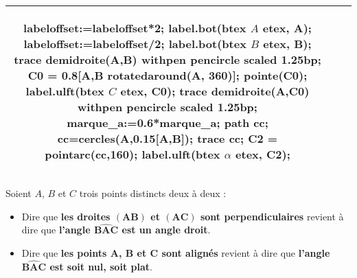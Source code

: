 \begin{changemargin}{0mm}{-20mm}
\begin{definition}[Classement des angles selon leur mesure $\alpha=\widehat{BAC}$]
\begin{center}
{\begin{tabular}{|*3{c|}}
\begin{Geometrie}[CoinBG={(-u,-0.5u)},CoinHD={(2.5u,1.5u)}]
                labeloffset:=labeloffset*2;
                label.bot(btex $A$ etex, A);
                labeloffset:=labeloffset/2;
                label.bot(btex $B$ etex, B);
                trace demidroite(A,B) withpen pencircle scaled 1.25bp;
                C0 = 0.8[A,B rotatedaround(A, 360)];
                pointe(C0);
                label.ulft(btex $C$ etex, C0);
                trace demidroite(A,C0) withpen pencircle scaled 1.25bp;
                marque_a:=0.6*marque_a;
                path cc;
                cc=cercles(A,0.15[A,B]);
                trace cc;
                C2 = pointarc(cc,160);
                label.ulft(btex $\alpha$ etex, C2);
            \end{Geometrie}\\\hline
        \end{tabular}    
        }
    \end{center}
\end{definition}

\begin{propriete}
    Soient $A$, $B$ et $C$ trois points distincts deux à deux :
    \begin{itemize}
        \item Dire que \textbf{les droites $\mathbf{(AB)}$ et $\mathbf{(AC)}$ sont perpendiculaires} revient à dire que \textbf{l'angle $\widehat{\mathbf{BAC}}$ est un angle droit}.
        \item Dire que \textbf{les points $\mathbf{A}$, $\mathbf{B}$ et $\mathbf{C}$ sont alignés} revient à dire que \textbf{l'angle $\widehat{\mathbf{BAC}}$ est soit nul, soit plat}.
    \end{itemize}
\end{propriete}
\end{changemargin}


